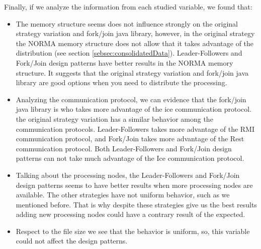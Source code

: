 Finally, if we analyze the information from each studied variable, we found that:
\begin{itemize}
	\item The memory structure seems does not influence strongly on the original strategy variation and fork/join java library, however, in the original strategy the NORMA memory structure does not allow that it takes advantage of the distribution (see section \ref{sebsec:consolidatedData}). Leader-Followers and Fork/Join design patterns have better results in the NORMA memory structure. It suggests that the original strategy variation and fork/join java library are good options when you need to distribute the processing.
	\item  Analyzing the communication protocol, we can evidence that the fork/join java library is who takes more advantage of the ice communication protocol. the original strategy variation has a similar behavior among the communication protocols. Leader-Followers takes more advantage of the RMI communication protocol, and Fork/Join takes more advantage of the Rest communication protocol. Both Leader-Followers and Fork/Join design patterns can not take much advantage of the Ice communication protocol.
	\item Talking about the processing nodes, the Leader-Followers and Fork/Join design patterns seems to have better results when more processing nodes are available. The other strategies have not uniform behavior, such as we mentioned before. That is why despite these strategies give us the best results adding new processing nodes could have a contrary result of the expected.
	\item Respect to the file size we see that the behavior is uniform, so, this variable could not affect the design patterns.
\end{itemize}

